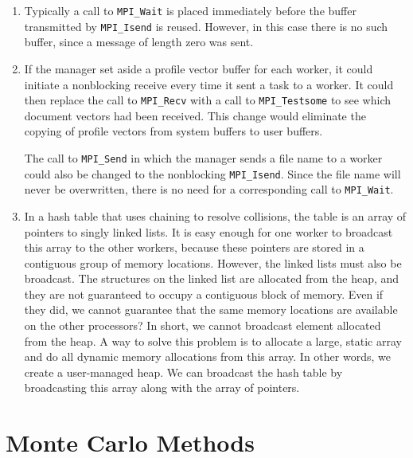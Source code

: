 \begin{enumerate}
\item Typically a call to {\tt MPI\_Wait} is placed immediately before the
      buffer transmitted by {\tt MPI\_Isend} is reused. However, in this case
      there is no such buffer, since a message of length zero was sent.

\item If the manager set aside a profile vector buffer for each worker, it
      could initiate a nonblocking receive every time it sent a task to a
      worker. It could then replace the call to {\tt MPI\_Recv} with a call
      to {\tt MPI\_Testsome} to see which document vectors had been received.
      This change would eliminate the copying of profile vectors from system
      buffers to user buffers.

      The call to {\tt MPI\_Send} in which the manager sends a file name to
      a worker could also be changed to the nonblocking {\tt MPI\_Isend}.
      Since the file name will never be overwritten, there is no need for
      a corresponding call to {\tt MPI\_Wait}.

\item In a hash table that uses chaining to resolve collisions, the table
      is an array of pointers to singly linked lists.
      It is easy enough for one worker to broadcast this array to the other
      workers, because these pointers are stored in a contiguous group of
      memory locations.
      However, the linked lists must also be broadcast. The structures
      on the linked list are allocated from the heap, and
      they are not guaranteed to occupy a contiguous
      block of memory. Even if they did, we cannot guarantee that the same
      memory locations are available on the other processors?
      In short, we cannot broadcast element allocated from the heap.
      A way to solve this problem is to allocate a large, static array and
      do all dynamic memory allocations from this array. In other words,
      we create a user-managed heap.
      We can broadcast the hash table by broadcasting this array along with
      the array of pointers.
\end{enumerate}

\chapter{Monte Carlo Methods}


